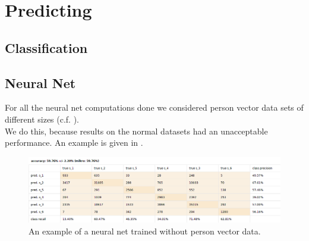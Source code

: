 \documentclass[runningheads]{llncs}
\begin{document}
	\section{Predicting}
	
	\subsection{Classification}
	\subsection{Neural Net}
	For all the neural net computations done we considered person vector data sets of different sizes (c.f. ).\\
	We do this, because results on the normal datasets had an unacceptable performance. An example is given in .	
	\begin{figure}
		\centering
		\includegraphics[scale = 0.4]{src/pic/NN_without_vector.png}
		\caption{An example of a neural net trained without person vector data.}
		\label{fig: NN without vector}
	\end{figure}
	
\end{document}
